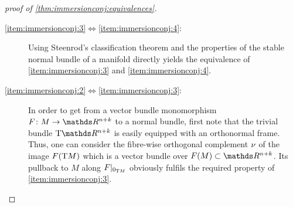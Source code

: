 \begin{proof}[proof of \autoref{thm:immersionconj:equivalences}]
  \begin{description}
  \item[\ref{item:immersionconj:3}$\Leftrightarrow$\ref{item:immersionconj:4}:]
    Using Steenrod's classification theorem
    and the properties of the stable normal bundle of a manifold
    directly yields the equivalence of \ref{item:immersionconj:3} and
    \ref{item:immersionconj:4}.
  \item[\ref{item:immersionconj:2}$\Leftrightarrow$\ref{item:immersionconj:3}:]
    In order to get from a vector bundle monomorphism
    $F\colon M\to\R^{n+k}$ to a normal bundle, first note that the
    trivial bundle $\T{\R^{n+k}}$ is easily equipped with an
    orthonormal frame. Thus, one can consider the fibre-wise orthogonal
    complement $\nu_{}$ of the image $F(\mathrm{T}M)$ which is a vector bundle over
    $F(M)\subset\R^{n+k}$. Its pullback to $M$ along
    $F|_{0_{\mathrm{T}M}}$ obviously fulfils the required property of
    \ref{item:immersionconj:3}.
    

\end{description}
\end{proof}
